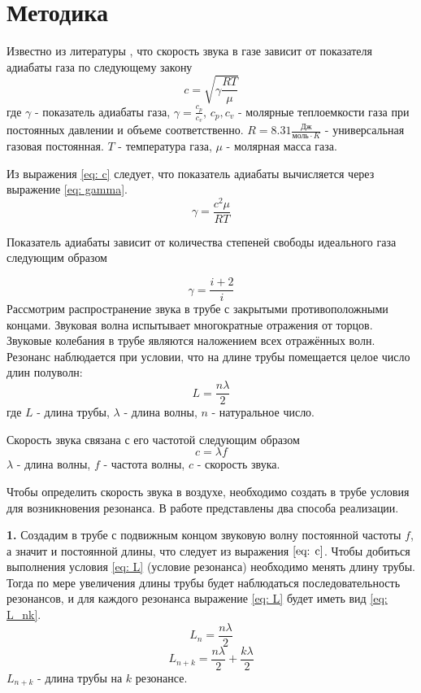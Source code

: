 \section{Методика}

Известно из литературы \cite{Sivuhin}, что скорость звука в газе зависит от показателя адиабаты газа по следующему закону
\begin{equation}
    c = \sqrt{\gamma \frac{RT}{\mu}} \label{eq: c}
\end{equation}
где $\gamma$ - показатель адиабаты газа, $\gamma = \frac{c_p}{c_v}$, $c_p, c_v$ - молярные теплоемкости газа при постоянных давлении и объеме соответственно. $R = 8.31\frac{\text{Дж}}{\text{моль}\cdot K}$ - универсальная газовая постоянная. $T$ - температура газа, $\mu$ - молярная масса газа.

Из выражения \eqref{eq: c} следует, что показатель адиабаты вычисляется через выражение \eqref{eq: gamma}.
\begin{equation}
    \gamma = \frac{c^2 \mu}{RT} \label{eq: gamma}
\end{equation}

Показатель адиабаты зависит от количества степеней свободы идеального газа следующим образом

\begin{equation}
    \gamma = \frac{i+2}{i} \label{eq: i}
\end{equation}
Рассмотрим распространение звука в трубе с закрытыми противоположными концами. Звуковая волна испытывает многократные отражения от торцов. Звуковые колебания в трубе являются наложением всех отражённых волн. Резонанс наблюдается при условии, что на длине трубы помещается целое число длин полуволн:
\begin{equation}
    L = \frac{n\lambda}{2} \label{eq: L}
\end{equation}
где $L$ - длина трубы, $\lambda$ - длина волны, $n$ - натуральное число.

Скорость звука связана с его частотой следующим образом
\begin{equation}
    c = \lambda f \label{eq: c}
\end{equation}
$\lambda$ - длина волны, $f$ - частота волны, $c$ - скорость звука.

Чтобы определить скорость звука в воздухе, необходимо создать в трубе условия для возникновения резонанса. В работе представлены два способа реализации.

\textbf{1.} Создадим в трубе с подвижным концом звуковую волну постоянной частоты $f$, а значит и постоянной длины, что следует из выражения $\eqref{eq: c}$. Чтобы добиться выполнения условия \eqref{eq: L} (условие резонанса) необходимо менять длину трубы. Тогда по мере увеличения длины трубы будет наблюдаться последовательность резонансов, и для каждого резонанса выражение \eqref{eq: L} будет иметь вид \eqref{eq: L_nk}.
\[L_n = \frac{n\lambda}{2}\]
\begin{equation}
    L_{n+k} = \frac{n\lambda}{2} + \frac{k\lambda}{2} \label{eq: L_nk}
\end{equation}
$L_{n+k}$ - длина трубы на $k$ резонансе.

